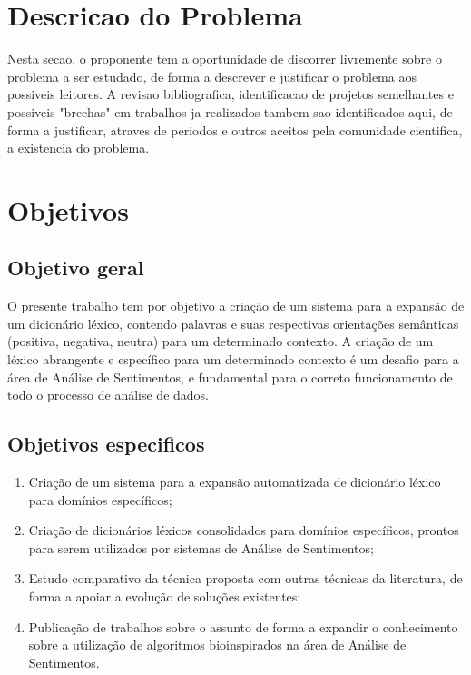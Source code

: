 \documentclass[a4paper,11pt]{article}
\begin{document}
\section{Descricao do Problema}
Nesta secao, o proponente tem a oportunidade de discorrer livremente sobre o problema a ser estudado, de forma a descrever e justificar o problema aos possiveis leitores.  A revisao bibliografica, identificacao de projetos semelhantes e possiveis "brechas" em trabalhos ja realizados tambem sao identificados aqui, de forma a justificar, atraves de periodos e outros aceitos pela comunidade cientifica, a existencia do problema.

\section{Objetivos}

\subsection{Objetivo geral}
O presente trabalho tem por objetivo a criação de um sistema para a expansão de um dicionário léxico, contendo palavras e suas respectivas orientações semânticas (positiva, negativa, neutra) para um determinado contexto. A criação de um léxico abrangente e específico para um determinado contexto é um desafio para a área de Análise de Sentimentos, e fundamental para o correto funcionamento de todo o processo de análise de dados.

\subsection{Objetivos especificos}

\begin{enumerate}
\item Criação de um sistema para a expansão automatizada de dicionário léxico para domínios específicos;
\item Criação de dicionários léxicos consolidados para domínios específicos, prontos para serem utilizados por sistemas de Análise de Sentimentos;
\item Estudo comparativo da técnica proposta com outras técnicas da literatura, de forma a apoiar a evolução de soluções existentes;
\item Publicação de trabalhos sobre o assunto de forma a expandir o conhecimento sobre a utilização de algoritmos bioinspirados na área de Análise de Sentimentos.

\end{enumerate}
\end{document}

